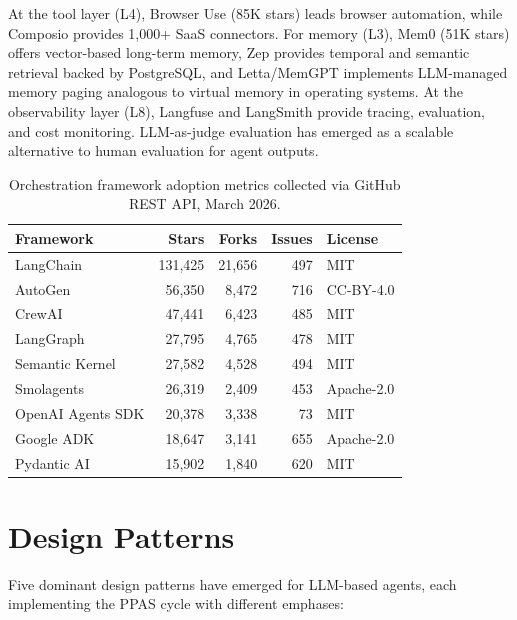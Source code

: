 \documentclass[review,authoryear]{elsarticle}
\theoremstyle{definition}
\begin{document}
At the tool layer (L4), Browser Use (85K stars) leads browser automation, while Composio provides 1,000+ SaaS connectors. For memory (L3), Mem0 \citep{mem0_2024} (51K stars) offers vector-based long-term memory, Zep \citep{zep2024} provides temporal and semantic retrieval backed by PostgreSQL, and Letta/MemGPT \citep{packer2023memgpt} implements LLM-managed memory paging analogous to virtual memory in operating systems. At the observability layer (L8), Langfuse \citep{langfuse2024} and LangSmith \citep{langsmith2024} provide tracing, evaluation, and cost monitoring. LLM-as-judge evaluation \citep{zheng2024judging} has emerged as a scalable alternative to human evaluation for agent outputs.

\begin{table}[ht]
\centering
\caption{Orchestration framework adoption metrics collected via GitHub REST API, March 2026.}
\label{tab:frameworks}
\begin{tabular}{lrrrl}
\toprule
\textbf{Framework} & \textbf{Stars} & \textbf{Forks} & \textbf{Issues} & \textbf{License} \\
\midrule
LangChain        & 131,425 & 21,656 & 497  & MIT \\
AutoGen          & 56,350  & 8,472  & 716  & CC-BY-4.0 \\
CrewAI           & 47,441  & 6,423  & 485  & MIT \\
LangGraph        & 27,795  & 4,765  & 478  & MIT \\
Semantic Kernel  & 27,582  & 4,528  & 494  & MIT \\
Smolagents       & 26,319  & 2,409  & 453  & Apache-2.0 \\
OpenAI Agents SDK& 20,378  & 3,338  & 73   & MIT \\
Google ADK       & 18,647  & 3,141  & 655  & Apache-2.0 \\
Pydantic AI      & 15,902  & 1,840  & 620  & MIT \\
\bottomrule
\end{tabular}
\end{table}

\section{Design Patterns}\label{sec:patterns}

Five dominant design patterns have emerged for LLM-based agents, each implementing the PPAS cycle with different emphases:
\end{document}

